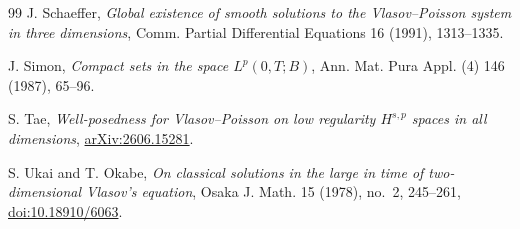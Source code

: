 \documentclass[11pt]{article}
\begin{document}
\begin{thebibliography}{99}
J. Schaeffer,
\emph{Global existence of smooth solutions to the Vlasov--Poisson system in
three dimensions},
Comm. Partial Differential Equations 16 (1991), 1313--1335.

J. Simon,
\emph{Compact sets in the space $L^p(0,T;B)$},
Ann. Mat. Pura Appl. (4) 146 (1987), 65--96.

S. Tae,
\emph{Well-posedness for Vlasov--Poisson on low regularity $H^{s,p}$ spaces
in all dimensions},
\href{https://arxiv.org/abs/2606.15281}{arXiv:2606.15281}.


S. Ukai and T. Okabe,
\emph{On classical solutions in the large in time of two-dimensional
Vlasov's equation},
Osaka J. Math. 15 (1978), no.~2, 245--261,
\href{https://doi.org/10.18910/6063}{doi:10.18910/6063}.


\end{thebibliography}
\end{document}
